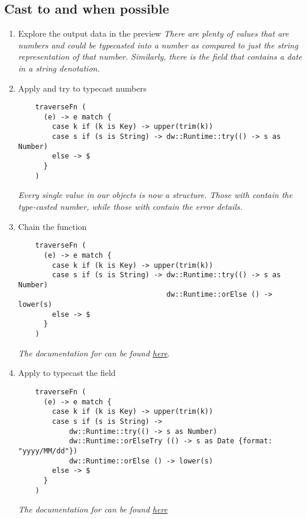 \subsection{Cast to  and  when possible}
\begin{enumerate}[resume*]
\item Explore the output data in the preview
  \newline
  \emph{
    There are plenty of values that are numbers and could be typecasted into a number as compared to just the string representation of that number.  Similarly, there is the  field that contains a date in a string denotation.
  }
\item Apply  and try to typecast numbers
  \begin{lstlisting}
    traverseFn (
      (e) -> e match {
        case k if (k is Key) -> upper(trim(k))
        case s if (s is String) -> dw::Runtime::try(() -> s as Number)
        else -> $
      }
    )
  \end{lstlisting}
  \emph{
    Every single value in our objects is now a  structure.  Those with  contain the type-casted number, while those with  contain the error details.
  }
\item Chain the  function
  \begin{lstlisting}
    traverseFn (
      (e) -> e match {
        case k if (k is Key) -> upper(trim(k))
        case s if (s is String) -> dw::Runtime::try(() -> s as Number)
                                   dw::Runtime::orElse () -> lower(s)
        else -> $
      }
    )
  \end{lstlisting}
  \emph{
    The documentation for  can be found \href{https://docs.mulesoft.com/mule-runtime/4.3/dw-runtime-functions-orelse}{here}.
  }
\item Apply  to typecast the  field
  \begin{lstlisting}
    traverseFn (
      (e) -> e match {
        case k if (k is Key) -> upper(trim(k))
        case s if (s is String) ->
            dw::Runtime::try(() -> s as Number)
            dw::Runtime::orElseTry (() -> s as Date {format: "yyyy/MM/dd"})
            dw::Runtime::orElse () -> lower(s)
        else -> $
      }
    )
  \end{lstlisting}
  \emph{
    The documentation for  can be found \href{https://docs.mulesoft.com/mule-runtime/4.3/dw-runtime-functions-orelsetry}{here}
  }
\end{enumerate}
